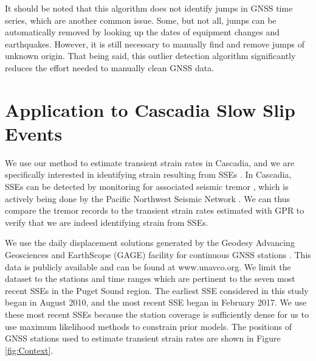 \documentclass[extra,mreferee]{gji}
\begin{document}
It should be noted that this algorithm does not identify jumps in GNSS time series, which are another common issue. Some, but not all, jumps can be automatically removed by looking up the dates of equipment changes and earthquakes. However, it is still necessary to manually find and remove jumps of unknown origin. That being said, this outlier detection algorithm significantly reduces the effort needed to manually clean GNSS data.       

\section{Application to Cascadia Slow Slip Events}\label{sec:Cascadia}
We use our method to estimate transient strain rates in Cascadia, and we are specifically interested in identifying strain resulting from SSEs \citep[e.g.,][]{Dragert2001}. In Cascadia, SSEs can be detected by monitoring for associated seismic tremor \citep{Rogers2003}, which is actively being done by the Pacific Northwest Seismic Network \citep{Wech2010}. We can thus compare the tremor records to the transient strain rates estimated with GPR to verify that we are indeed identifying strain from SSEs.  

We use the daily displacement solutions generated by the Geodesy Advancing Geosciences and EarthScope (GAGE) facility for continuous GNSS stations \citep{Herring2016}. This data is publicly available and can be found at www.unavco.org. We limit the dataset to the stations and time ranges which are pertinent to the seven most recent SSEs in the Puget Sound region. The earliest SSE considered in this study began in August 2010, and the most recent SSE began in February 2017. We use these most recent SSEs because the station coverage is sufficiently dense for us to use maximum likelihood methods to constrain prior models.  The positions of GNSS stations used to estimate transient strain rates are shown in Figure \ref{fig:Context}.  
\end{document}
